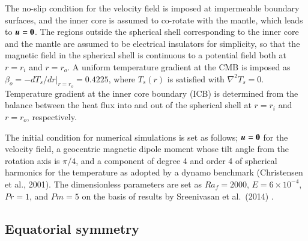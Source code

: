 The no-slip condition for the velocity field is imposed at impermeable boundary surfaces, and the inner core is assumed to co-rotate with the mantle, which leads to $\mbox{\boldmath$u$} = {\bf 0}$.
The regions outside the spherical shell corresponding to the inner core and the mantle are assumed to be electrical insulators for simplicity, so that the magnetic field in the spherical shell is continuous to a potential field both at $r = r_i$ and $r = r_o$.
A uniform temperature gradient at the CMB is imposed as $\beta_o = -d T_s / dr |_{r = r_o} = 0.4225$, where $T_s (r)$ is satisfied with $\nabla^2 T_s = 0$.
{\color{red}
Temperature gradient
}
at the inner core boundary (ICB) is determined from the balance between the heat flux 
{\color{red}
into and out of the spherical shell at $r = r_i$ and $r = r_o$, respectively.
}

The initial condition for numerical simulations is set as follows; $\mbox{\boldmath$u$} = {\bf 0}$ for the velocity field, a geocentric magnetic dipole moment whose tilt angle from the rotation axis is $\pi / 4$, and a component of degree 4 and order 4 of spherical harmonics for the temperature as adopted by a dynamo benchmark (Christensen et al., 2001).
The dimensionless parameters are set as $Ra_f = 2000$, $E = 6 \times 10^{-4}$, $Pr = 1$, and $Pm = 5$ on the basis of results by Sreenivasan et al.\ (2014) \cite{Sreenivasan:2014}.


\subsection{Equatorial symmetry}

